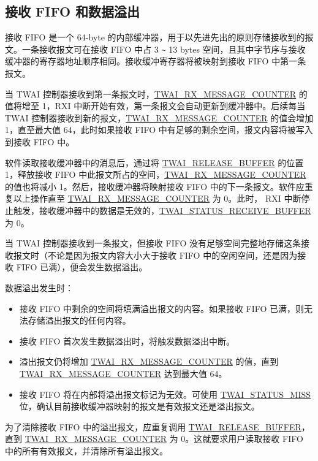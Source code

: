 \documentclass[main\_\_CN.tex]{subfiles}
\begin{document}
\subsection{接收 FIFO 和数据溢出}

接收 FIFO 是一个 64-byte 的内部缓冲器，用于以先进先出的原则存储接收到的报文。一条接收报文可在接收 FIFO 中占 3 \verb+~+ 13 bytes 空间，且其中字节序与接收缓冲器的寄存器地址顺序相同。接收缓冲寄存器将被映射到接收 FIFO 中第一条报文。


当 TWAI 控制器接收到第一条报文时，\hyperref[fielddesc:TWAIRXMESSAGECOUNTER]{TWAI\_RX\_MESSAGE\_COUNTER} 的值将增至 1，RXI 中断开始有效，第一条报文会自动更新到缓冲器中。后续每当 TWAI 控制器接收到新的报文，\hyperref[fielddesc:TWAIRXMESSAGECOUNTER]{TWAI\_RX\_MESSAGE\_COUNTER} 的值会增加 1，直至最大值 64，此时如果接收 FIFO 中有足够的剩余空间，报文内容将被写入到接收 FIFO 中。

软件读取接收缓冲器中的消息后，通过将 \hyperref[fielddesc:TWAIRELEASEBUFFER]{TWAI\_RELEASE\_BUFFER} 的位置 1，释放接收 FIFO 中此报文所占的空间，\hyperref[fielddesc:TWAIRXMESSAGECOUNTER]{TWAI\_RX\_MESSAGE\_COUNTER} 的值也将减小 1。然后，接收缓冲器将映射接收 FIFO 中的下一条报文。软件应重复以上操作直至 \hyperref[fielddesc:TWAIRXMESSAGECOUNTER]{TWAI\_RX\_MESSAGE\_COUNTER} 为 0。此时， RXI 中断停止触发，接收缓冲器中的数据是无效的，\hyperref[fielddesc:TWAISTATUSRECEIVEBUFFER]{TWAI\_STATUS\_RECEIVE\_BUFFER} 为 0。

当 TWAI 控制器接收到一条报文，但接收 FIFO 没有足够空间完整地存储这条接收报文时（不论是因为报文内容大小大于接收 FIFO 中的空闲空间，还是因为接收 FIFO 已满），便会发生数据溢出。

数据溢出发生时：
\begin{itemize}
    \item 接收 FIFO 中剩余的空间将填满溢出报文的内容。如果接收 FIFO 已满，则无法存储溢出报文的任何内容。
    \item 接收 FIFO 首次发生数据溢出时，将触发数据溢出中断。
    \item 溢出报文仍将增加 \hyperref[fielddesc:TWAIRXMESSAGECOUNTER]{TWAI\_RX\_MESSAGE\_COUNTER} 的值，直到 \hyperref[fielddesc:TWAIRXMESSAGECOUNTER]{TWAI\_RX\_MESSAGE\_COUNTER} 达到最大值 64。
    \item 接收 FIFO 将在内部将溢出报文标记为无效。可使用 \hyperref[fielddesc:TWAISTATUSMISS]{TWAI\_STATUS\_MISS} 位，确认目前接收缓冲器映射的报文是有效报文还是溢出报文。
\end{itemize}

为了清除接收 FIFO 中的溢出报文，应重复调用 \hyperref[fielddesc:TWAIRELEASEBUFFER]{TWAI\_RELEASE\_BUFFER}，直到 \hyperref[fielddesc:TWAIRXMESSAGECOUNTER]{TWAI\_RX\_MESSAGE\_COUNTER} 为 0。这就要求用户读取接收 FIFO 中的所有有效报文，并清除所有溢出报文。
\end{document}
